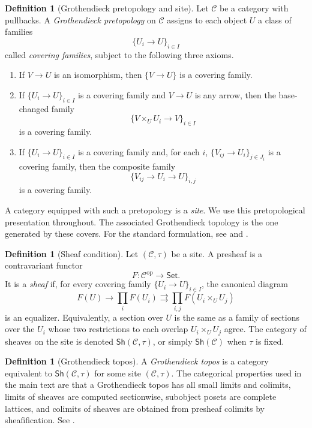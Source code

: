 \documentclass[10pt]{amsart}
\newcommand{\Set}{\mathsf{Set}}
\newcommand{\Sh}{\mathsf{Sh}}
\theoremstyle{plain}
\theoremstyle{definition}
\newtheorem{definition}[theorem]{Definition}
\begin{document}
\begin{definition}[Grothendieck pretopology and site]
Let $\mathcal C$ be a category with pullbacks. A \emph{Grothendieck
pretopology} on $\mathcal C$ assigns to each object $U$ a class of families
\[
  \{U_i\to U\}_{i\in I}
\]
called \emph{covering families}, subject to the following three axioms.
\begin{enumerate}[label=(\roman*)]
\item If $V\to U$ is an isomorphism, then $\{V\to U\}$ is a covering family.
\item If $\{U_i\to U\}_{i\in I}$ is a covering family and $V\to U$ is any
arrow, then the base-changed family
\[
  \{V\times_U U_i\to V\}_{i\in I}
\]
is a covering family.
\item If $\{U_i\to U\}_{i\in I}$ is a covering family and, for each $i$,
$\{V_{ij}\to U_i\}_{j\in J_i}$ is a covering family, then the composite family
\[
  \{V_{ij}\to U_i\to U\}_{i,j}
\]
is a covering family.
\end{enumerate}
A category equipped with such a pretopology is a \emph{site}. We use this
pretopological presentation throughout. The associated Grothendieck topology is
the one generated by these covers. For the standard formulation, see
\cite[Ch.~III]{MacLaneMoerdijk} and \cite[Vol.~2, C2]{JohnstoneTopos}.
\end{definition}

\begin{definition}[Sheaf condition]
Let $(\mathcal C,\tau)$ be a site. A presheaf is a contravariant functor
\[
  F:\mathcal C^{\mathrm{op}}\to\Set.
\]
It is a \emph{sheaf} if, for every covering family $\{U_i\to U\}_{i\in I}$, the
canonical diagram
\[
  F(U)\longrightarrow \prod_i F(U_i)
  \rightrightarrows
  \prod_{i,j}F(U_i\times_U U_j)
\]
is an equalizer. Equivalently, a section over $U$ is the same as a family of
sections over the $U_i$ whose two restrictions to each overlap
$U_i\times_U U_j$ agree. The category of sheaves on the site is denoted
$\Sh(\mathcal C,\tau)$, or simply $\Sh(\mathcal C)$ when
$\tau$ is fixed.
\end{definition}

\begin{definition}[Grothendieck topos]
A \emph{Grothendieck topos} is a category equivalent to
$\Sh(\mathcal C,\tau)$ for some site $(\mathcal C,\tau)$. The categorical
properties used in the main text are that a Grothendieck topos has all small
limits and colimits, limits of sheaves are computed sectionwise, subobject
posets are complete lattices, and colimits of sheaves are obtained from
presheaf colimits by sheafification. See
\cite{MacLaneMoerdijk,JohnstoneTopos}.
\end{definition}
\end{document}
